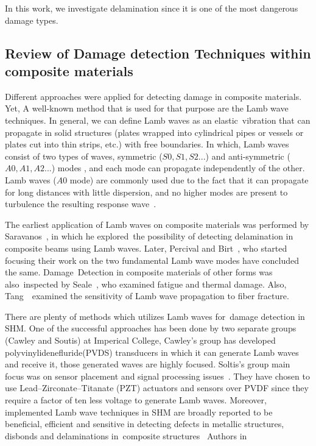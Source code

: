 \documentclass[preprint,9pt]{elsarticle}
\begin{document}
    

    In this work, we investigate delamination since it is one of the most dangerous damage types.

\subsection{Review of Damage detection Techniques within composite materials }	
Different approaches were applied for detecting damage in composite materials. Yet, A well-known method that is used for that purpose are the Lamb wave techniques. In general, we can define Lamb waves as an elastic vibration that can propagate in solid structures (plates wrapped into cylindrical pipes or vessels or plates cut into thin strips, etc.) with free boundaries. In which, Lamb waves consist of two types of waves, symmetric ($S0,S1,S2...$) and anti-symmetric ($A0,A1,A2...$) modes , and each mode can propagate independently of the other. Lamb waves ($A0$ mode) are commonly used due to the fact that it can propagate for long distances with little dispersion, and no higher modes are present to turbulence the resulting response wave~\cite{Valed2000}.
	
The earliest application of Lamb waves on composite materials was performed by Saravanos~\cite{doi:10.2514/6.1994-1754}, in which he explored the possibility of detecting delamination in composite beams using Lamb waves. Later, Percival and Birt~\cite{Percival1997}, who started focusing their work on the two fundamental Lamb wave modes have concluded the same. Damage Detection in composite materials of other forms was also inspected by Seale~\cite{Seale1998}, who examined fatigue and thermal damage. Also, Tang~\cite{Tang1989} examined the sensitivity of Lamb wave propagation to fiber fracture.

There are plenty of methods which utilizes Lamb waves for damage detection in SHM. One of the successful approaches has been done by two separate groups (Cawley and Soutis) at Imperical College, Cawley's group has developed polyvinylidenefluride(PVDS) transducers in which it can generate Lamb waves and receive it, those generated waves are highly focused. Soltis's group main focus was on sensor placement and signal processing issues~\cite{Valed2000,Valed2000a,Valed2001}. They have chosen to use Lead–Zirconate–Titanate (PZT) actuators and sensors over PVDF since they require a factor of ten less voltage to generate Lamb waves. Moreover, implemented Lamb wave techniques in SHM are broadly reported to be beneficial, efficient and sensitive in detecting defects in metallic structures, disbonds and delaminations in composite structures~\cite{Boller2000,Diamanti2004,Su2006,Raghavan2007,Diamanti2007} \newline Authors in~\cite{Ng2009} 
	
\end{document}
